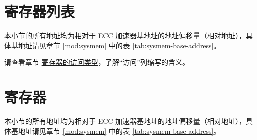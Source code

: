 \documentclass[main\_\_CN.tex]{subfiles}
\begin{document}

\clearpage
\hypertarget{ecc-reg-summ}{}
\section{寄存器列表}
\label{sec:ecc-reg-summ}

本小节的所有地址均为相对于 ECC 加速器基地址的地址偏移量（相对地址），具体基地址请见章节 \ref{mod:sysmem} \textit{} 中的表 \ref{tab:sysmem-base-address}。

请查看章节 \hyperref[glossary-access-types]{寄存器的访问类型}，了解“访问”列缩写的含义。






\clearpage
\section{寄存器}

本小节的所有地址均为相对于 ECC 加速器基地址的地址偏移量（相对地址），具体基地址请见章节 \ref{mod:sysmem} \textit{} 中的表 \ref{tab:sysmem-base-address}。


\end{document}
